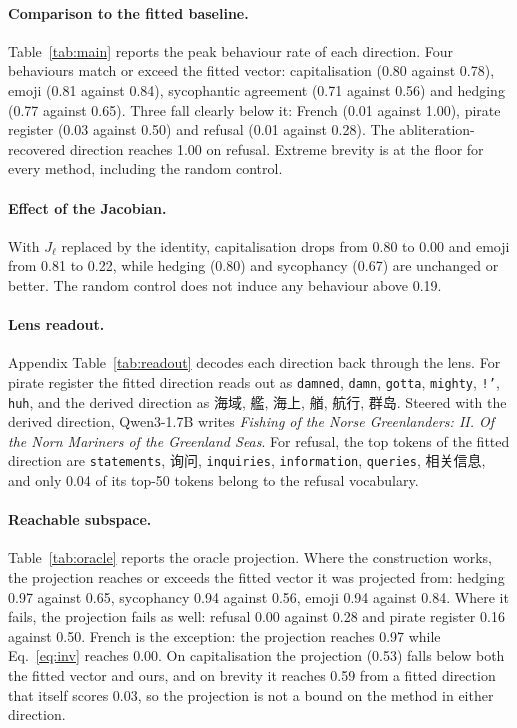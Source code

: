 \documentclass{article}
\newcommand{\zh}[1]{{\zhfont #1}}
\begin{document}
\paragraph{Comparison to the fitted baseline.}
Table~\ref{tab:main} reports the peak behaviour rate of each direction. Four behaviours match or exceed the fitted vector: capitalisation (0.80 against 0.78), emoji (0.81 against 0.84), sycophantic agreement (0.71 against 0.56) and hedging (0.77 against 0.65). Three fall clearly below it: French (0.01 against 1.00), pirate register (0.03 against 0.50) and refusal (0.01 against 0.28). The abliteration-recovered direction reaches 1.00 on refusal. Extreme brevity is at the floor for every method, including the random control.

\paragraph{Effect of the Jacobian.}
With $J_\ell$ replaced by the identity, capitalisation drops from 0.80 to 0.00 and emoji from 0.81 to 0.22, while hedging (0.80) and sycophancy (0.67) are unchanged or better. The random control does not induce any behaviour above 0.19.

\paragraph{Lens readout.}
Appendix Table~\ref{tab:readout} decodes each direction back through the lens. For pirate register the fitted direction reads out as \texttt{damned}, \texttt{damn}, \texttt{gotta}, \texttt{mighty}, \texttt{!'}, \texttt{huh}, and the derived direction as \zh{海域}, \zh{艦}, \zh{海上}, \zh{艏}, \zh{航行}, \zh{群岛}. Steered with the derived direction, Qwen3-1.7B writes \emph{Fishing of the Norse Greenlanders: II. Of the Norn Mariners of the Greenland Seas}. For refusal, the top tokens of the fitted direction are \texttt{statements}, \zh{询问}, \texttt{inquiries}, \texttt{information}, \texttt{queries}, \zh{相关信息}, and only 0.04 of its top-50 tokens belong to the refusal vocabulary.

\paragraph{Reachable subspace.}
Table~\ref{tab:oracle} reports the oracle projection. Where the construction works, the projection reaches or exceeds the fitted vector it was projected from: hedging 0.97 against 0.65, sycophancy 0.94 against 0.56, emoji 0.94 against 0.84. Where it fails, the projection fails as well: refusal 0.00 against 0.28 and pirate register 0.16 against 0.50. French is the exception: the projection reaches 0.97 while Eq.~\ref{eq:inv} reaches 0.00. On capitalisation the projection (0.53) falls below both the fitted vector and ours, and on brevity it reaches 0.59 from a fitted direction that itself scores 0.03, so the projection is not a bound on the method in either direction.
\end{document}
